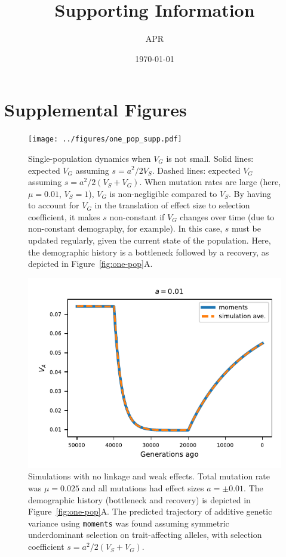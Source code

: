 \documentclass[]{article}
\title{Supporting Information}
\author{APR}
\date{\today}
\newcommand{\moments}{\texttt{moments}\xspace}
\begin{document}
\maketitle

\renewcommand{\thesection}{S\arabic{section}}
\renewcommand{\thetable}{S\arabic{table}}
\renewcommand{\thefigure}{S\arabic{figure}}

\section{Supplemental Figures}

\begin{figure}[ht!]
    \centering
    \texttt{[image: ../figures/one\_pop\_supp.pdf]}
    \caption{
        Single-population dynamics when $V_G$ is not small.
        Solid lines: expected $V_G$ assuming $s=a^2/2V_S$. Dashed lines:
        expected $V_G$ assuming $s=a^2/2(V_S+V_G)$. When mutation rates
        are large (here, $\mu=0.01$, $V_S=1$), $V_G$ is non-negligible
        compared to $V_S$. By having to account for $V_G$ in the
        translation of effect size to selection coefficient, it makes
        $s$ non-constant if $V_G$ changes over time (due to non-constant
        demography, for example). In this case, $s$ must be updated
        regularly, given the current state of the population.
        Here, the demographic history is a bottleneck followed by a
        recovery, as depicted in Figure~\ref{fig:one-pop}A.
    }
    \label{fig:supp-one-pop}
\end{figure}

\begin{figure}[ht!]
    \centering
    \includegraphics{../figures/one_pop.a_0.01.pdf}
    \caption{
        Simulations with no linkage and weak effects.
        Total mutation rate was $\mu=0.025$ and all mutations had effect
        sizes $a=\pm 0.01$. The demographic history (bottleneck and
        recovery) is depicted in Figure~\ref{fig:one-pop}A. The predicted
        trajectory of additive genetic variance using \moments was found
        assuming symmetric underdominant selection on trait-affecting
        alleles, with selection coefficient $s=a^2/2(V_S+V_G)$.
    }
    \label{fig:one-pop-0.01}
\end{figure}
\end{document}
